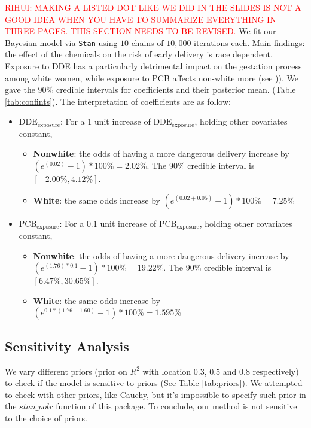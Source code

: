 \documentclass[10pt]{jmlr}%
\begin{document}
\textcolor{red}{RIHUI: MAKING A LISTED DOT LIKE WE DID IN THE SLIDES IS NOT A GOOD IDEA WHEN YOU HAVE TO SUMMARIZE EVERYTHING IN THREE PAGES. THIS SECTION NEEDS TO BE REVISED.}
We fit our Bayesian model via {\tt Stan} using $10$ chains of $10,000$ iterations each.
Main findings: the effect of the chemicals on the risk of early delivery is race dependent. Exposure to DDE has a particularly detrimental impact on the gestation process among white women, while exposure to PCB affects non-white more (see )).
We gave the 90\% credible intervals for coefficients and their posterior mean. (Table \ref{tab:confints}). The interpretation of coefficients are as follow:
\begin{itemize}
	\item $\text{DDE}_{\text{exposure}}$: For a 1 unit increase of $\text{DDE}_{\text{exposure}}$, holding other covariates constant,
		    \begin{itemize}
		    	\item \textbf{Nonwhite}: the odds of having a more dangerous delivery increase by $(e^{(0.02)}-1)*100\%=2.02\%$. The 90\% credible interval is $[-2.00\%, 4.12\%]$.
		    	\item \textbf{White}:  the same odds increase by $(e^{(0.02+0.05)}-1)*100\%=7.25\%$
		    \end{itemize}
	\item $\text{PCB}_{\text{exposure}}$: For a $0.1$ unit increase of $\text{PCB}_{\text{exposure}}$, holding other covariates constant,
			\begin{itemize}
				\item \textbf{Nonwhite}: the odds of having a more dangerous delivery increase by $(e^{(1.76)*0.1}-1)*100\%=19.22\%$. The 90\% credible interval is $[6.47\%,30.65\%]$.
				\item \textbf{White}:  the same odds increase by $(e^{0.1*(1.76-1.60)}-1)*100\%=1.595\%$
			\end{itemize}
\end{itemize}

\subsection{Sensitivity Analysis}
We vary different priors (prior on $R^2$ with location $0.3$, $0.5$ and $0.8$ respectively) to check if the model is sensitive to priors (See Table \ref{tab:priors}). We attempted to check with other priors, like Cauchy, but it's impossible to specify such prior in the $stan\_polr$ function of this package. To conclude, our method is not sensitive to the choice of priors.
\end{document}
